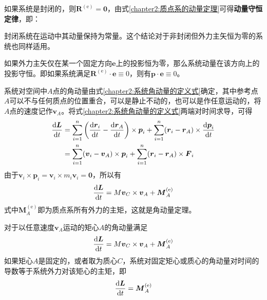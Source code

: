 如果系统是封闭的，则$\boldsymbol{R}^{(\mathrm{e})} = \boldsymbol{0}$，由式\eqref{chapter2:质点系的动量定理}可得{\bf 动量守恒定律}，即：

\begin{theorem}[动量守恒定律]
	封闭系统在运动中其动量保持为常量。这个结论对于非封闭但外力主矢恒为零的系统也同样适用。
\end{theorem}

如果外力主矢仅在某一个固定方向$\boldsymbol{e}$上的投影恒为零，那么系统动量在该方向上的投影守恒。即如果系统满足$\boldsymbol{R}^{(\mathrm{e})}\cdot \boldsymbol{e} \equiv 0$，则有$\boldsymbol{p}\cdot \boldsymbol{e} \equiv 0$。

系统对空间中$A$点的角动量由式\eqref{chapter2:系统角动量的定义式}确定，其中参考点$A$可以不与任何质点的位置重合，可以是静止不动的，也可以是作任意运动的，将$A$点的速度记作$\boldsymbol{v}_A$。将式\eqref{chapter2:系统角动量的定义式}两端对时间求导，可得
\begin{align*}
	\dfrac{\mathrm{d} \boldsymbol{L}}{\mathrm{d} t} & = \sum_{i=1}^n \left(\dfrac{\mathrm{d} \boldsymbol{r}_i}{\mathrm{d} t} - \dfrac{\mathrm{d} \boldsymbol{r}_A}{\mathrm{d} t}\right)\times \boldsymbol{p}_i + \sum_{i=1}^n (\boldsymbol{r}_i - \boldsymbol{r}_A) \times \dfrac{\mathrm{d} \boldsymbol{p}_i}{\mathrm{d} t} \\
	& = \sum_{i=1}^n (\boldsymbol{v}_i - \boldsymbol{v}_A) \times \boldsymbol{p}_i + \sum_{i=1}^n (\boldsymbol{r}_i - \boldsymbol{r}_A) \times \boldsymbol{F}_i
\end{align*}
由于$\boldsymbol{v}_i \times \boldsymbol{p}_i = \boldsymbol{v}_i \times m_i\boldsymbol{v}_i = \boldsymbol{0}$，所以有
\begin{equation}
	\dfrac{\mathrm{d} \boldsymbol{L}}{\mathrm{d} t} = M\boldsymbol{v}_C \times \boldsymbol{v}_A + \boldsymbol{M}_A^{(\mathrm{e})}
\end{equation}
式中$\boldsymbol{M}_A^{(\mathrm{e})}$即为质点系所有外力的主矩，这就是角动量定理。

\begin{theorem}[角动量定理]
	对于以任意速度$\boldsymbol{v}_A$运动的矩心$A$的角动量满足
	\begin{equation}
		\dfrac{\mathrm{d} \boldsymbol{L}}{\mathrm{d} t} = M\boldsymbol{v}_C \times \boldsymbol{v}_A + \boldsymbol{M}_A^{(\mathrm{e})}
		\label{chapter2:质点系对任意矩心的角动量定理}
	\end{equation}
	如果矩心$A$是固定的，或者取为质心$C$，系统对固定矩心或质心的角动量对时间的导数等于系统外力对该矩心的主矩，即
	\begin{equation}
		\dfrac{\mathrm{d} \boldsymbol{L}}{\mathrm{d} t} = \boldsymbol{M}_A^{(\mathrm{e})}
		\label{chapter2:质点系的角动量定理}
	\end{equation}
\end{theorem}

